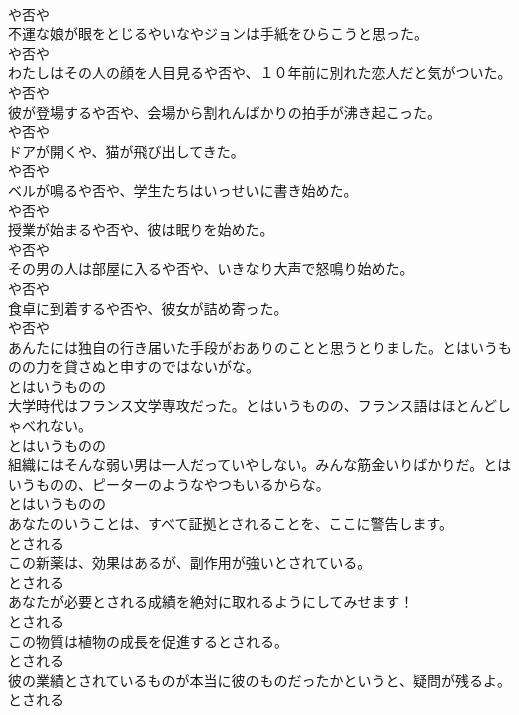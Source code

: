\documentclass[8pt]{extreport}
\begin{document}
\begin{CJK}{UTF8}{min}
\\	や否や	
\\	不運な娘が眼をとじるやいなやジョンは手紙をひらこうと思った。	
\\	や否や	
\\	わたしはその人の顔を人目見るや否や、１０年前に別れた恋人だと気がついた。	
\\	や否や	
\\	彼が登場するや否や、会場から割れんばかりの拍手が沸き起こった。	
\\	や否や	
\\	ドアが開くや、猫が飛び出してきた。	
\\	や否や	
\\	ベルが鳴るや否や、学生たちはいっせいに書き始めた。	
\\	や否や	
\\	授業が始まるや否や、彼は眠りを始めた。	
\\	や否や	
\\	その男の人は部屋に入るや否や、いきなり大声で怒鳴り始めた。	
\\	や否や	
\\	食卓に到着するや否や、彼女が詰め寄った。	
\\	や否や	
\\	あんたには独自の行き届いた手段がおありのことと思うとりました。とはいうものの力を貸さぬと申すのではないがな。	
\\	とはいうものの	
\\	大学時代はフランス文学専攻だった。とはいうものの、フランス語はほとんどしゃべれない。	
\\	とはいうものの	
\\	組織にはそんな弱い男は一人だっていやしない。みんな筋金いりばかりだ。とはいうものの、ピーターのようなやつもいるからな。	
\\	とはいうものの	
\\	あなたのいうことは、すべて証拠とされることを、ここに警告します。	
\\	とされる	
\\	この新薬は、効果はあるが、副作用が強いとされている。	
\\	とされる	
\\	あなたが必要とされる成績を絶対に取れるようにしてみせます！	
\\	とされる	
\\	この物質は植物の成長を促進するとされる。	
\\	とされる	
\\	彼の業績とされているものが本当に彼のものだったかというと、疑問が残るよ。	
\\	とされる	

\end{CJK}
\end{document}
